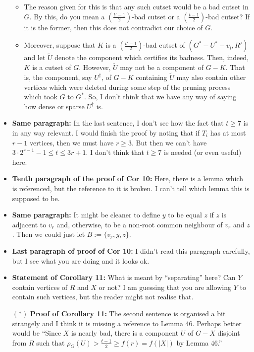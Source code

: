 \documentclass[11 pt]{article}
\theoremstyle{definition}
\theoremstyle{case}
\numberwithin{equation}{section}
\begin{document}
\begin{itemize}
\begin{itemize}
\item The reason given for this is that any such cutset would be a bad cutset in $G$. By this, do you mean a $\left(\frac{t'-1}{2}\right)$-bad cutset or a $\left(\frac{t-1}{2}\right)$-bad cutset? If it is the former, then this does not contradict our choice of $G$. 
\item Moreover, suppose that $K$ is a $\left(\frac{t'-1}{2}\right)$-bad cutset of $(G^*-U^*-v_i,R')$ and let $\tilde{U}$ denote the component which certifies its badness. Then, indeed, $K$ is a cutset of $G$. However, $\tilde{U}$ may not be a component of $G-K$. That is, the component, say $U^\dagger$, of $G-K$ containing $\tilde{U}$ may also contain other vertices which were deleted during some step of the pruning process which took $G$ to $G^*$. So, I don't think that we have any way of saying how dense or sparse $U^\dagger$ is. 
\end{itemize}
\item \textbf{Same paragraph:} In the last sentence, I don't see how the fact that $t\geq7$ is in any way relevant. I would finish the proof by noting that if $T_i$ has at most $r-1$ vertices, then we must have $r\geq3$. But then we can't have $3\cdot 2^{r-1} - 1 \leq t\leq 3r+1$. I don't think that $t\geq7$ is needed (or even useful) here.
\item \textbf{Tenth paragraph of the proof of Cor 10:} Here, there is a lemma which is referenced, but the reference to it is broken. I can't tell which lemma this is supposed to be. 
\item \textbf{Same paragraph:} It might be cleaner to define $y$ to be equal $z$ if $z$ is adjacent to $v_r$ and, otherwise, to be a non-root common neighbour of $v_r$ and $z$. Then we could just let $B:=\{v_r,y,z\}$. 
\item \textbf{Last paragraph of proof of Cor 10:} I didn't read this paragraph carefully, but I see what you are doing and it looks ok. 
\item \textbf{Statement of Corollary 11:} What is meant by ``separating'' here? Can $Y$ contain vertices of $R$ and $X$ or not? I am guessing that you are allowing $Y$ to contain such vertices, but the reader might not realise that. 
\item[$\boldsymbol{(*)}$] \textbf{Proof of Corollary 11:} The second sentence is organised a bit strangely and I think it is missing a reference to Lemma 46. Perhaps better would be ``Since $X$ is nearly bad, there is a component $U$ of $G-X$ disjoint from $R$ such that $\rho_G(U)> \frac{t-1}{2}\geq f(r) =f(|X|)$ by Lemma 46.''

\end{itemize}
\end{document}
